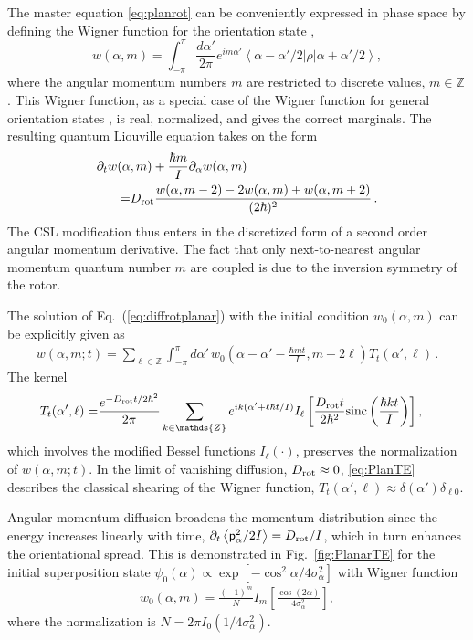 \documentclass[%
 twocolumn,
 amsmath,amssymb,
 aps,
 pra,
]{revtex4-1}
\newcommand{\op}[1]{{\sf #1}}
\begin{document}
The master equation \eqref{eq:planrot} can be conveniently expressed in phase space by defining the Wigner function for the orientation state \cite{Leonardt1995Wigner,Rigas2011Wigner}, 
\begin{equation} \label{eq:wignerf}
w(\alpha,m) = \int_{-\pi}^\pi \frac{d\alpha'}{2 \pi} e^{i m  \alpha'} \left<\alpha - \alpha'/2\right|\rho\left|\alpha + \alpha'/2\right>,
\end{equation}
where the angular momentum numbers $m$ are restricted to discrete values, $m \in \mathds{Z}$. This Wigner function, as a  special case of the Wigner function for general orientation states \cite{fischer2013Wigner}, is real, normalized, and gives the correct marginals. The resulting quantum Liouville equation takes on the form
\begin{align}
\partial_t w(\alpha&,m)+\frac{\hbar m}{I}\partial_\alpha w(\alpha,m)\nonumber\\
=&D_{\rm rot}\frac{w(\alpha,m-2)-2w(\alpha,m)+w(\alpha,m+2)}{(2\hbar)^2}\,.
\label{eq:diffrotplanar}
\end{align}
The CSL modification thus enters in the discretized form of a second order angular momentum derivative. 
The fact that only next-to-nearest angular momentum quantum number $m$ are coupled is due to the inversion symmetry of the rotor.

The solution of Eq.~(\ref{eq:diffrotplanar}) with the initial condition $w_0(\alpha,m)$ can be explicitly given as
\begin{align}
w(\alpha,m;t)
=\sum_{\ell\in \mathds{Z}}\int_{-\pi}^\pi d\alpha'\,w_0\left(\alpha-\alpha'-\frac{\hbar m t}{I},m-2\ell\right)T_t(\alpha',\ell)\,.
\label{eq:PlanTE}
\end{align}
The kernel
\begin{align}
T_t(\alpha',\ell)=&\frac{e^{-D_{\rm rot}t/2\hbar^2}}{2\pi}\sum_{k\in \mathds{Z}}
e^{ik(\alpha'+\ell\hbar t/I)}I_\ell\left[\frac{D_{\rm rot}t}{2\hbar^2}{\rm sinc}\left(\frac{\hbar k t}{I}\right)\right],
\label{eq:PlanProp}
\end{align}
which involves  the modified Bessel functions $I_\ell(\cdot)$, preserves the normalization of $w(\alpha,m;t)$. In the limit of vanishing diffusion, $D_{\rm rot} \approx 0$, \eqref{eq:PlanTE} describes the classical shearing of the Wigner function, $T_t(\alpha',\ell) \approx \delta(\alpha') \delta_{\ell 0}$.

 
Angular momentum diffusion broadens the momentum distribution since the energy increases linearly with time, $\partial_t\left<\op{p}_{\alpha}^2/2 I\right>=D_{\rm rot}/I$, which in turn enhances the orientational spread. This is demonstrated in Fig.~\ref{fig:PlanarTE} for the initial superposition state $\psi_0(\alpha) \propto \exp[-\cos^2\alpha/4 \sigma^2_\alpha]$ with Wigner function
\begin{align}
w_0(\alpha,m)=\frac{(-1)^m}{N} I_m \left [ \frac{\cos(2\alpha)}{4 \sigma^2_\alpha} \right ],
\label{eq:OrientGauss}
\end{align} 
where the normalization is $N = 2 \pi I_0 ( 1 / 4 \sigma^2_\alpha)$.
\end{document}
